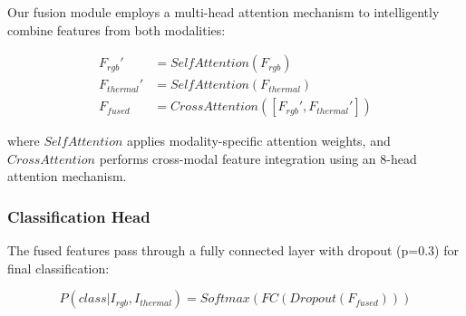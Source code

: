 \documentclass[conference]{IEEEtran}
\begin{document}
Our fusion module employs a multi-head attention mechanism to intelligently combine features from both modalities:

\begin{align}
F_{rgb}' &= SelfAttention(F_{rgb}) \\
F_{thermal}' &= SelfAttention(F_{thermal}) \\
F_{fused} &= CrossAttention([F_{rgb}', F_{thermal}'])
\end{align}

where $SelfAttention$ applies modality-specific attention weights, and $CrossAttention$ performs cross-modal feature integration using an 8-head attention mechanism.

\subsubsection{Classification Head}

The fused features pass through a fully connected layer with dropout (p=0.3) for final classification:

\begin{equation}
P(class|I_{rgb}, I_{thermal}) = Softmax(FC(Dropout(F_{fused})))
\end{equation}
\end{document}
